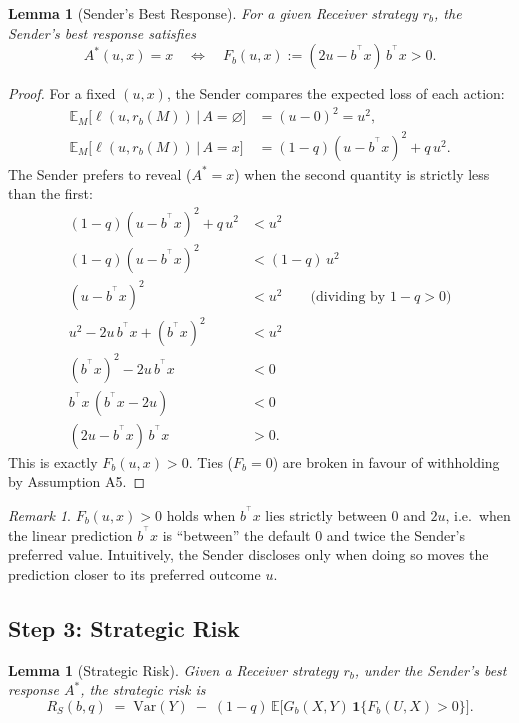 \documentclass[11pt]{article}
\newtheorem{lemma}[theorem]{Lemma}
\theoremstyle{definition}
\theoremstyle{remark}
\newtheorem{remark}[theorem]{Remark}
\newcommand{\E}{\mathbb{E}}
\newcommand{\T}{^{\top}}
\begin{document}
\begin{lemma}[Sender's Best Response]\label{lem:sender}
  For a given Receiver strategy $r_{b}$, the Sender's best response satisfies
  \[
    A^{*}(u,x) = x
    \quad\iff\quad
    F_{b}(u,x) := (2u - b^{\T}x)\,b^{\T}x > 0.
  \]
\end{lemma}

\begin{proof}
For a fixed $(u,x)$, the Sender compares the expected loss of each action:
\begin{align*}
  \E_{M}\!\bigl[\ell(u,r_{b}(M))\,\big|\,A=\varnothing\bigr]
  &= (u-0)^{2} = u^{2},\\
  \E_{M}\!\bigl[\ell(u,r_{b}(M))\,\big|\,A=x\bigr]
  &= (1-q)(u-b^{\T}x)^{2} + q\,u^{2}.
\end{align*}
The Sender prefers to reveal ($A^{*}=x$) when the second quantity is strictly less
than the first:
\begin{align*}
  (1-q)(u-b^{\T}x)^{2} + q\,u^{2} &< u^{2}\\
  (1-q)(u-b^{\T}x)^{2} &< (1-q)\,u^{2}\\
  (u-b^{\T}x)^{2} &< u^{2}
    \qquad\text{(dividing by }1-q>0\text{)}\\
  u^{2} - 2u\,b^{\T}x + (b^{\T}x)^{2} &< u^{2}\\
  (b^{\T}x)^{2} - 2u\,b^{\T}x &< 0\\
  b^{\T}x\,(b^{\T}x - 2u) &< 0\\
  (2u - b^{\T}x)\,b^{\T}x &> 0.
\end{align*}
This is exactly $F_{b}(u,x)>0$.
Ties ($F_{b}=0$) are broken in favour of withholding by Assumption A5.
\end{proof}

\begin{remark}
  $F_{b}(u,x)>0$ holds when $b^{\T}x$ lies strictly between $0$ and $2u$, i.e.\ when the
  linear prediction $b^{\T}x$ is ``between'' the default $0$ and twice the Sender's preferred
  value.  Intuitively, the Sender discloses only when doing so moves the prediction closer to
  its preferred outcome $u$.
\end{remark}

\subsection{Step 3: Strategic Risk}

\begin{lemma}[Strategic Risk]\label{lem:strategic}
  Given a Receiver strategy $r_{b}$, under the Sender's best response $A^{*}$, the
  strategic risk is
  \begin{equation}\label{eq:strategic}
    R_{S}(b,q)
    \;=\;
    \mathrm{Var}(Y)
    \;-\;
    (1-q)\,\E\!\bigl[G_{b}(X,Y)\,\mathbf{1}\{F_{b}(U,X)>0\}\bigr].
  \end{equation}
\end{lemma}
\end{document}
